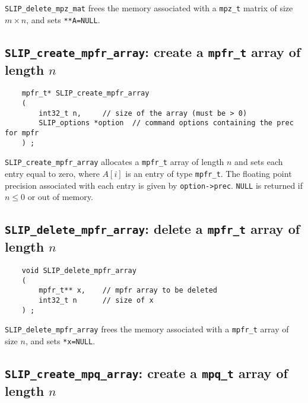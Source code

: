 \documentclass[12pt]{article}
\theoremstyle{definition}
\begin{document}
\verb|SLIP_delete_mpz_mat| frees the memory associated with a \verb|mpz_t|
matrix of size $m \times n$, and sets \verb|**A=NULL|.

\cprotect\subsection{\verb|SLIP_create_mpfr_array|: create a \verb|mpfr_t| array of length $n$}

\begin{mdframed}[userdefinedwidth=6in]
{\footnotesize
\begin{verbatim}
    mpfr_t* SLIP_create_mpfr_array
    (
        int32_t n,     // size of the array (must be > 0)
        SLIP_options *option  // command options containing the prec for mpfr
    ) ;
\end{verbatim}
} \end{mdframed}

\verb|SLIP_create_mpfr_array| allocates a \verb|mpfr_t| array of length $n$
and sets each entry equal to zero, where  $A[i]$ is an entry of type
\verb|mpfr_t|. The floating point precision associated with each entry is given
by \verb|option->prec|. \verb|NULL| is returned if
$n\le 0$ or out of memory.


\cprotect\subsection{\verb|SLIP_delete_mpfr_array|: delete a \verb|mpfr_t| array of length $n$}

\begin{mdframed}[userdefinedwidth=6in]
{\footnotesize
\begin{verbatim}
    void SLIP_delete_mpfr_array
    (
        mpfr_t** x,    // mpfr array to be deleted
        int32_t n      // size of x
    ) ;
\end{verbatim}
} \end{mdframed}

\verb|SLIP_delete_mpfr_array| frees the memory associated with a \verb|mpfr_t|
array of size $n$, and sets \verb|*x=NULL|.

\cprotect\subsection{\verb|SLIP_create_mpq_array|: create a \verb|mpq_t| array of length $n$}
\end{document}
